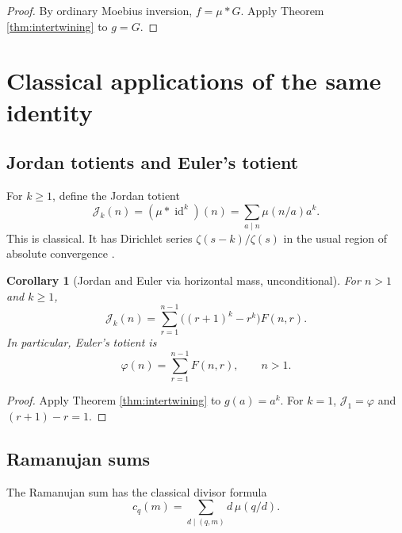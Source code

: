 \documentclass[11pt]{amsart}
\numberwithin{equation}{section}
\theoremstyle{plain}
\newtheorem{corollary}[theorem]{Corollary}
\theoremstyle{definition}
\theoremstyle{remark}
\newcommand{\mob}{\mu}
\newcommand{\zetaR}{\zeta}
\newcommand{\Fsurf}{F}
\newcommand{\Jordan}{\mathcal J}
\begin{document}
\begin{proof}
By ordinary Moebius inversion, \(f=\mob*G\).  Apply Theorem \ref{thm:intertwining} to \(g=G\).
\end{proof}

\section{Classical applications of the same identity}
\label{sec:classical_applications}

\subsection{Jordan totients and Euler's totient}
\label{subsec:jordan}

For \(k\ge1\), define the Jordan totient
\begin{equation}
\Jordan_k(n)=(\mob*\operatorname{id}^k)(n)=\sum_{a\mid n}\mob(n/a)a^k.
\label{eq:jordan_def}
\end{equation}
This is classical.  It has Dirichlet series \(\zetaR(s-k)/\zetaR(s)\) in the usual region of absolute convergence \cite{Apostol1976}.

\begin{corollary}[Jordan and Euler via horizontal mass, unconditional]
\label{cor:jordan_surface}
For \(n>1\) and \(k\ge1\),
\begin{equation}
\Jordan_k(n)=\sum_{r=1}^{n-1}\bigl((r+1)^k-r^k\bigr)\Fsurf(n,r).
\label{eq:jordan_surface}
\end{equation}
In particular, Euler's totient is
\begin{equation}
\varphi(n)=\sum_{r=1}^{n-1}\Fsurf(n,r),
\qquad n>1.
\label{eq:euler_totient_surface}
\end{equation}
\end{corollary}

\begin{proof}
Apply Theorem \ref{thm:intertwining} to \(g(a)=a^k\).  For \(k=1\), \(\Jordan_1=\varphi\) and \((r+1)-r=1\).
\end{proof}

\subsection{Ramanujan sums}
\label{subsec:ramanujan}

The Ramanujan sum has the classical divisor formula
\begin{equation}
c_q(m)=\sum_{d\mid(q,m)} d\,\mob(q/d).
\label{eq:ramanujan_classical}
\end{equation}
\end{document}
